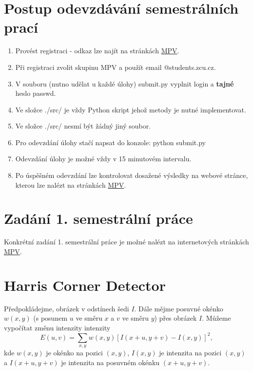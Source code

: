 \documentclass[12pt, a4paper]{article}
\begin{document}
\section{Postup odevzdávání semestrálních prací}

\begin{enumerate}
	\item Provést registraci - odkaz lze najít na stránkách \href{http://www.kky.zcu.cz/cs/courses/mpv}{MPV}.
	\item Při registraci zvolit skupinu MPV a použít email \textsf{@students.zcu.cz}.
	\item V souboru (nutno udělat u každé úlohy) \textsf{submit.py} vyplnit \textsf{login} a \textbf{tajné} heslo \textsf{passwd}.
	\item Ve složce \textsf{./src/} je vždy Python skript jehož metody je nutné implementovat.
	\item Ve složce \textsf{./src/} nesmí být žádný jiný soubor.
	\item Pro odevzdání úlohy stačí napsat do konzole: \textsf{python submit.py}
	\item Odevzdání úlohy je možné vždy v 15 minutovém intervalu.
	\item Po úspěšném odevzdání lze kontrolovat dosažené výsledky na webové stránce, kterou lze nalézt na stránkách \href{http://www.kky.zcu.cz/cs/courses/mpv}{MPV}.
\end{enumerate}






\section{Zadání 1. semestrální práce}
\par{Konkrétní zadání 1. semestrální práce je možné nalézt na internetových stránkách \href{http://www.kky.zcu.cz/cs/courses/mpv}{MPV}.}






\newpage





\section{Harris Corner Detector}
\par{Předpokládejme, obrázek v odstínech šedi $I$. Dále mějme posuvné okénko $w(x, y)$ (s posunem $u$ ve směru $x$ a $v$ ve směru $y$) přes obrázek $I$. Můžeme vypočítat změnu intenzity intenzity
\begin{equation}
	E(u, v) = \sum_{x,y} w(x, y) \left[ I(x + u, y + v) - I(x, y) \right]^2,
\end{equation}
kde $w(x,y)$ je okénko na pozici $(x,y)$, $I(x,y)$ je intenzita na pozici $(x,y)$ a $I(x+u,y+v)$ je intenzita na posuvném okénku $(x+u,y+v)$.}
\end{document}
